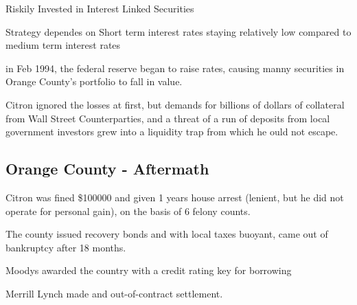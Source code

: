 \documentclass[PRMIA4A.tex]{subfiles}
\begin{document}
Riskily Invested in Interest Linked Securities

Strategy dependes on Short term interest rates staying relatively low compared to medium term interest rates

in Feb 1994, the federal reserve began to raise rates, causing manny securities in Orange County's portfolio to fall in value.

Citron ignored the losses at first, but demands for billions of dollars of collateral from Wall Street Counterparties, and 
a threat of a run of deposits from local government investors grew into a liquidity trap from which he ould not escape.

\subsection*{Orange County - Aftermath}


Citron was fined \$100000 and given 1 years house arrest (lenient, but he did not operate for personal gain), on the basis 
of 6 felony counts.

The county issued recovery bonds and with local taxes buoyant, came out of bankruptcy after 18 months.

Moodys awarded the country with a credit rating key for borrowing

Merrill Lynch made and out-of-contract settlement.
\end{document}
